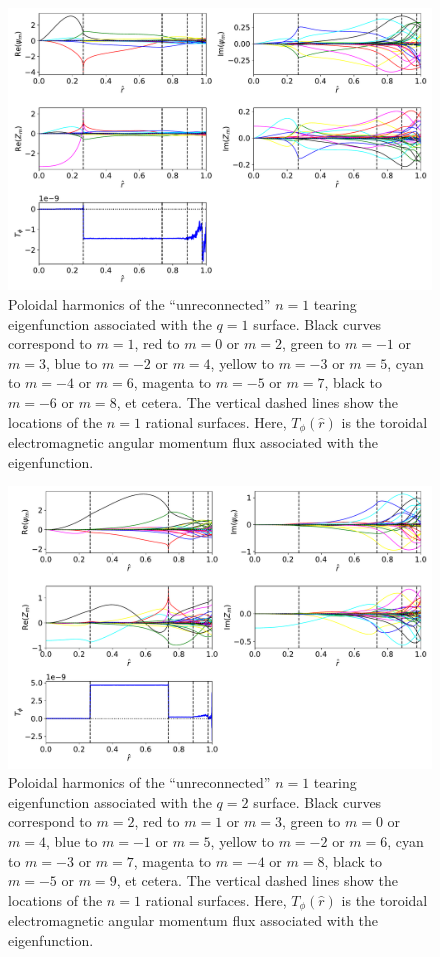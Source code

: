 \documentclass[12pt,prb,aps]{revtex4-1}
\begin{document}
\begin{figure}
\centerline{\includegraphics[width=\textwidth]{Figure7.pdf}}
\caption{Poloidal harmonics of the  ``unreconnected'' $n=1$ tearing eigenfunction associated with the $q=1$ surface. Black curves correspond to $m=1$, red to $m=0$ or $m=2$, green to $m=-1$ or $m=3$, blue to $m=-2$ or $m=4$, yellow to $m=-3$ or $m=5$,
cyan to $m=-4$ or $m=6$, magenta to $m=-5$ or $m=7$, black to $m=-6$ or $m=8$, et cetera. The vertical dashed lines show
the locations of the  $n=1$ rational surfaces.  Here, $T_\phi(\hat{r})$ is the toroidal electromagnetic angular momentum 
flux associated with the eigenfunction.}\label{f7}
\end{figure}

\begin{figure}
\centerline{\includegraphics[width=\textwidth]{Figure8.pdf}}
\caption{Poloidal harmonics of the ``unreconnected'' $n=1$ tearing eigenfunction associated with the $q=2$ surface. Black curves correspond to $m=2$, red to $m=1$ or $m=3$, green to $m=0$ or $m=4$, blue to $m=-1$ or $m=5$, yellow to $m=-2$ or $m=6$,
cyan to $m=-3$ or $m=7$, magenta to $m=-4$ or $m=8$, black to $m=-5$ or $m=9$, et cetera.  The vertical dashed lines show
the locations of the  $n=1$ rational surfaces.  Here, $T_\phi(\hat{r})$ is the toroidal electromagnetic angular momentum 
flux associated with the eigenfunction.}\label{f8}
\end{figure}
\end{document}
